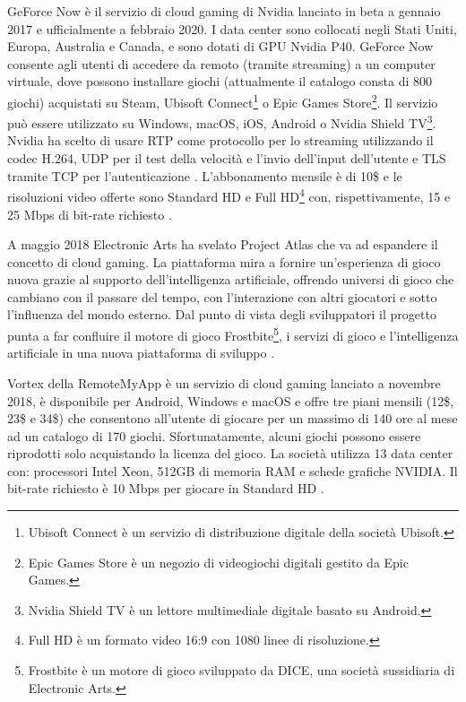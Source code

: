 GeForce Now è il servizio di cloud gaming di Nvidia lanciato in beta a gennaio 2017 e ufficialmente a febbraio 2020. I data center sono collocati negli Stati Uniti, Europa, Australia e Canada, e sono dotati di GPU Nvidia P40. GeForce Now consente agli utenti di accedere da remoto (tramite streaming) a un computer virtuale, dove possono installare giochi (attualmente il catalogo consta di 800 giochi) acquistati su Steam, Ubisoft Connect\footnote{Ubisoft Connect è un servizio di distribuzione digitale della società Ubisoft.} o Epic Games Store\footnote{Epic Games Store è un negozio di videogiochi digitali gestito da Epic Games.}. Il servizio può essere utilizzato su Windows, macOS, iOS, Android o Nvidia Shield TV\footnote{Nvidia Shield TV è un lettore multimediale digitale basato su Android.}.
Nvidia ha scelto di usare RTP come protocollo per lo streaming utilizzando il codec H.264, UDP per il test della velocità e l'invio dell'input dell'utente e TLS tramite TCP per l'autenticazione \parencite{A_Network_Analysis_on_Cloud_Gaming_Stadia_GeForce_Now_and_PSNow}. L'abbonamento mensile è di 10\$ e le risoluzioni video offerte sono Standard HD e Full HD\footnote{Full HD è un formato video 16:9 con 1080 linee di risoluzione.} con, rispettivamente, 15 e 25 Mbps di bit-rate richiesto \parencite{GeForce_Now}.

A maggio 2018 Electronic Arts ha svelato Project Atlas che va ad espandere il concetto di cloud gaming. La piattaforma mira a fornire un'esperienza di gioco nuova grazie al supporto dell'intelligenza artificiale, offrendo universi di gioco che cambiano con il passare del tempo, con l'interazione con altri giocatori e sotto l'influenza del mondo esterno. Dal punto di vista degli sviluppatori il progetto punta a far confluire il motore di gioco Frostbite\footnote{Frostbite è un motore di gioco sviluppato da DICE, una società sussidiaria di Electronic Arts.}, i servizi di gioco e l'intelligenza artificiale in una nuova piattaforma di sviluppo \parencite{Project_Atlas}.

Vortex della RemoteMyApp è un servizio di cloud gaming lanciato a novembre 2018, è disponibile per Android, Windows e macOS e offre tre piani mensili (12\$, 23\$ e 34\$) che consentono all'utente di giocare per un massimo di 140 ore al mese ad un catalogo di 170 giochi. Sfortunatamente, alcuni giochi possono essere riprodotti solo acquistando la licenza del gioco. La società utilizza 13 data center con: processori Intel Xeon, 512GB di memoria RAM e schede grafiche NVIDIA. Il bit-rate richiesto è 10 Mbps per giocare in Standard HD \parencite{RemoteMyApp_Vortex}.


